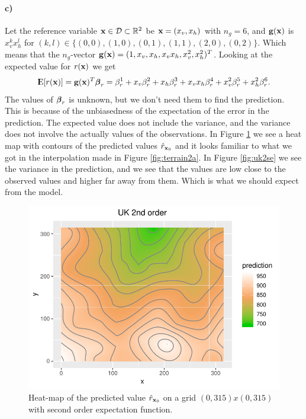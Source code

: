 \paragraph{c)}
Let the reference variable $\boldsymbol{\mathbf{x}} \in \mathcal{D} \subset \mathbb{R}^2$ be $\boldsymbol{\mathbf{x}} = (x_v, x_h)$ with $n_g = 6$, and $\boldsymbol{\mathbf{g}}(\boldsymbol{\mathbf{x}})$ is $x_v^kx_h^l$ for $(k,l) \in \{(0,0),(1,0),(0,1),(1,1),(2,0),(0,2)\}$. Which means that the $n_g$-vector $\boldsymbol{\mathbf{g}}(\boldsymbol{\mathbf{x}}) = (1,x_v,x_h,x_vx_h,x_v^2,x_h^2)^T$. Looking at the expected value for $r(\boldsymbol{\mathbf{x}})$ we get
\begin{equation*}
    {\rm I\kern-.3em E}[r(\boldsymbol{\mathbf{x}})] = \boldsymbol{\mathbf{g}}(\boldsymbol{\mathbf{x}})^T \boldsymbol{\mathbf{\beta}}_r = \beta_r^1 + x_v \beta_r^2 + x_h \beta_r^3 + x_v x_h \beta_r^4 + x_v^2 \beta_r^5 + x_h^2 \beta_r^6.
\end{equation*}
The values of $\boldsymbol{\mathbf{\beta}}_r$ is unknown, but we don't need them to find the prediction. This is because of the unbiasedness of the expectation of the error in the prediction. 
The expected value does not include the variance, and the variance does not involve the actually values of the observations. 
In Figure \ref{fig:uk2} we see a heat map with contours of the predicted values $\hat{r}_{\boldsymbol{\mathbf{x}}_0}$ and it looks familiar to what we got in the interpolation made in Figure \ref{fig:terrain2a}. In Figure \ref{fig:uk2se} we see the variance in the prediction, and we see that the values are low close to the observed values and higher far away from them. Which is what we should expect from the model.
\begin{figure}[htb]
    \centering
    \includegraphics{figures/uk2.pdf}
    \caption{Heat-map of the predicted value $\hat{r}_{\boldsymbol{\mathbf{x}}_0}$ on a grid $(0,315)x(0,315)$ with second order expectation function.}
    \label{fig:uk2}
\end{figure}

